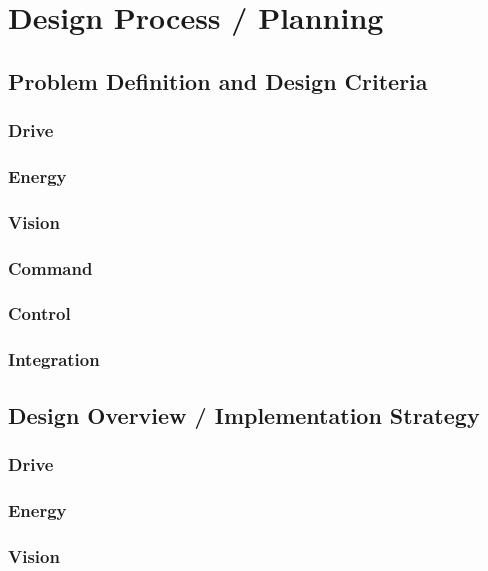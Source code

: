 \documentclass[10pt,twoside]{article}
\begin{document}
\vfill

\section{Design Process / Planning}
\subsection{Problem Definition and Design Criteria}

\subsubsection{Drive}

\subsubsection{Energy}

\subsubsection{Vision}

\subsubsection{Command}

\subsubsection{Control}

\subsubsection{Integration}

\subsection{Design Overview / Implementation Strategy}

\subsubsection{Drive}

\subsubsection{Energy}

\subsubsection{Vision}
\end{document}
